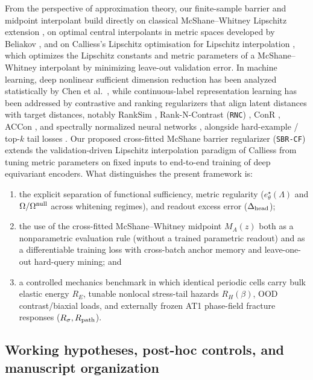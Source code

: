 \documentclass[preprint,11pt,a4paper]{elsarticle}
\begin{document}
From the perspective of approximation theory, our finite-sample barrier and midpoint interpolant build directly on classical McShane--Whitney Lipschitz extension \cite{McShane1934}, on optimal central interpolants in metric spaces developed by Beliakov \cite{Beliakov2006}, and on Calliess's Lipschitz optimisation for Lipschitz interpolation \cite{Calliess2017}, which optimizes the Lipschitz constants and metric parameters of a McShane--Whitney interpolant by minimizing leave-out validation error. In machine learning, deep nonlinear sufficient dimension reduction has been analyzed statistically by Chen et al.~\cite{Huang2024}, while continuous-label representation learning has been addressed by contrastive and ranking regularizers that align latent distances with target distances, notably RankSim \cite{RankSim2022}, Rank-N-Contrast (\texttt{RNC}) \cite{RNC2023}, ConR \cite{ConR2024}, ACCon \cite{ACCon2025}, and spectrally normalized neural networks \cite{Miyato2018,Anil2019}, alongside hard-example / top-$k$ tail losses \cite{Fan2017TopK}. Our proposed cross-fitted McShane barrier regularizer (\texttt{SBR-CF}) extends the validation-driven Lipschitz interpolation paradigm of Calliess \cite{Calliess2017} from tuning metric parameters on fixed inputs to end-to-end training of deep equivariant encoders. What distinguishes the present framework is:
\begin{enumerate}
    \item the explicit separation of functional sufficiency, metric regularity ($e^\star_\theta(\Lambda)$ and $\Omega/\Omega^{\rm null}$ across whitening regimes), and readout excess error ($\Delta_{\rm head}$);
    \item the use of the cross-fitted McShane--Whitney midpoint $M_A(z)$ both as a nonparametric evaluation rule (without a trained parametric readout) and as a differentiable training loss with cross-batch anchor memory and leave-one-out hard-query mining; and
    \item a controlled mechanics benchmark in which identical periodic cells carry bulk elastic energy $R_E$, tunable nonlocal stress-tail hazards $R_H(\beta)$, OOD contrast/biaxial loads, and externally frozen AT1 phase-field fracture responses ($R_\sigma, R_{\rm path}$).
\end{enumerate}

\subsection{Working hypotheses, post-hoc controls, and manuscript organization}
\label{sec:hyp}
\end{document}
